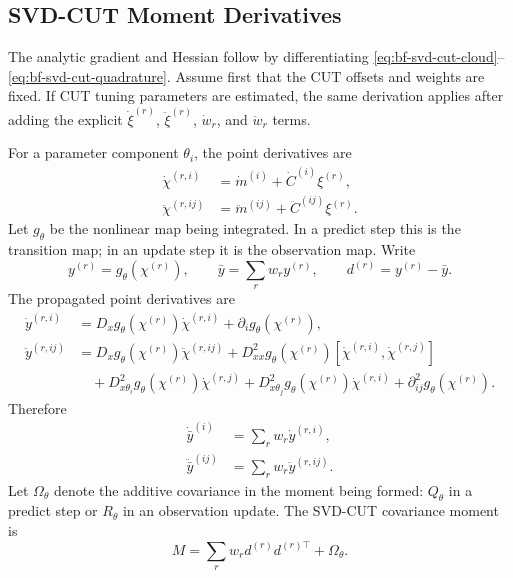\subsection{SVD-CUT Moment Derivatives}
\label{sec:bf-svd-cut-moment-derivatives}

The analytic gradient and Hessian follow by differentiating
\eqref{eq:bf-svd-cut-cloud}--\eqref{eq:bf-svd-cut-quadrature}.  Assume first
that the CUT offsets and weights are fixed.  If CUT tuning parameters are
estimated, the same derivation applies after adding the explicit
$\dot \xi^{(r)}$, $\ddot \xi^{(r)}$, $\dot w_r$, and $\ddot w_r$ terms.

For a parameter component $\theta_i$, the point derivatives are
\begin{align}
\label{eq:bf-svd-cut-point-first}
  \dot\chi^{(r,i)}
  &=
  \dot m^{(i)}+\dot C^{(i)}\xi^{(r)},\\
\label{eq:bf-svd-cut-point-second}
  \ddot\chi^{(r,ij)}
  &=
  \ddot m^{(ij)}+\ddot C^{(ij)}\xi^{(r)}.
\end{align}
Let $g_\theta$ be the nonlinear map being integrated.  In a predict step this
is the transition map; in an update step it is the observation map.  Write
\[
  y^{(r)}=g_\theta(\chi^{(r)}),\qquad
  \bar y=\sum_r w_r y^{(r)},\qquad
  d^{(r)}=y^{(r)}-\bar y .
\]
The propagated point derivatives are
\begin{align}
\label{eq:bf-svd-cut-map-first}
  \dot y^{(r,i)}
  &=
  D_xg_\theta(\chi^{(r)})\dot\chi^{(r,i)}
  +\partial_i g_\theta(\chi^{(r)}),\\
\label{eq:bf-svd-cut-map-second}
  \ddot y^{(r,ij)}
  &=
  D_xg_\theta(\chi^{(r)})\ddot\chi^{(r,ij)}
  +D^2_{xx}g_\theta(\chi^{(r)})
    [\dot\chi^{(r,i)},\dot\chi^{(r,j)}] \nonumber\\
  &\quad
  +D^2_{x\theta_i}g_\theta(\chi^{(r)})\dot\chi^{(r,j)}
  +D^2_{x\theta_j}g_\theta(\chi^{(r)})\dot\chi^{(r,i)}
  +\partial^2_{ij}g_\theta(\chi^{(r)}).
\end{align}
Therefore
\begin{align}
\label{eq:bf-svd-cut-mean-first}
  \dot{\bar y}^{(i)}
  &=
  \sum_r w_r\dot y^{(r,i)},\\
\label{eq:bf-svd-cut-mean-second}
  \ddot{\bar y}^{(ij)}
  &=
  \sum_r w_r\ddot y^{(r,ij)}.
\end{align}
Let $\Omega_\theta$ denote the additive covariance in the moment being formed:
$Q_\theta$ in a predict step or $R_\theta$ in an observation update.  The
SVD-CUT covariance moment is
\begin{equation}
\label{eq:bf-svd-cut-cov}
  M=\sum_r w_r d^{(r)}d^{(r)\top}+\Omega_\theta .
\end{equation}
